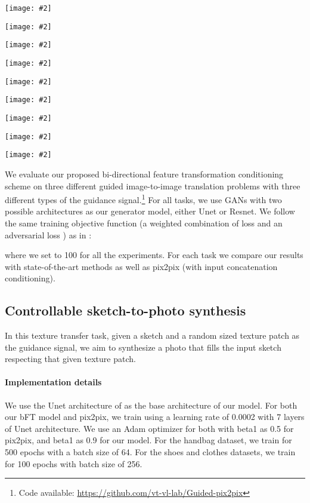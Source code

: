 \documentclass[10pt,twocolumn,letterpaper]{article}
\newlength\paramargin
\newlength\secmargin
\newlength\figcapmargin
\newcommand{\mpage}[2]
{
\begin{minipage}{#1\linewidth}\centering
#2
\end{minipage}
}
\newcommand{\mfigure}[2]
{
\begin{minipage}{#1\linewidth}\centering
\texttt{[image: \#2]}
\end{minipage}
}
\begin{document}
\begin{figure*}[hbtp]
\mpage{0.01}{} 
\mfigure{0.09}{{bags_results/target/29_6.png}}\hfill
\mfigure{0.09}{{bags_results/target/43_3.png}}\hfill
\mfigure{0.09}{{bags_results/target/98_1.png}}\hfill
\mfigure{0.07}{{shoes_results/target/0_7.png}}\hfill
\mfigure{0.07}{{shoes_results/target/3_0.png}}\hfill
\mfigure{0.07}{{shoes_results/target/37_9.png}}\hfill
\mfigure{0.07}{{clothes_results/target/0_0.png}}\hfill
\mfigure{0.07}{{clothes_results/target/2_0.png}}\hfill
\mfigure{0.07}{{clothes_results/target/3_0.png}}\hfill


\vspace{\figcapmargin}
\label{fig:texture}
\end{figure*} 

We evaluate our proposed bi-directional feature transformation conditioning scheme on three different guided image-to-image translation problems with three different types of the guidance signal.\footnote{Code available: \url{https://github.com/vt-vl-lab/Guided-pix2pix}} 
For all tasks, we use GANs with two possible architectures as our generator model, either Unet or Resnet. 
We follow the same training objective function (a weighted combination of  loss and an adversarial loss ) as in \cite{isola2017image}:

where we set  to 100 for all the experiments.
For each task we compare our results with state-of-the-art methods as well as pix2pix \cite{isola2017image} (with input concatenation conditioning). 


\vspace{\secmargin}
\subsection{Controllable sketch-to-photo synthesis}
In this texture transfer task, given a sketch and a random sized texture patch as the guidance signal, we aim to synthesize a photo that fills the input sketch respecting that given texture patch. 

\vspace{\paramargin}\paragraph{Implementation details} We use the Unet architecture of \cite{isola2017image} as the base architecture of our model. For both our bFT model and pix2pix, we train using a learning rate of 0.0002 with 7 layers of Unet architecture. We use an Adam optimizer for both with beta1 as 0.5 for pix2pix, and beta1 as 0.9 for our model.
For the handbag dataset, we train for 500 epochs with a batch size of 64. For the shoes and clothes datasets, we train for 100 epochs with batch size of 256.
\end{document}
